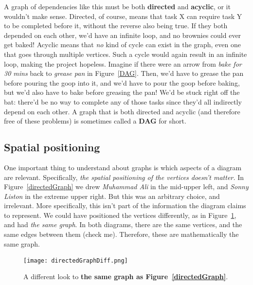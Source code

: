 \begin{description}
A graph of dependencies like this must be both \textbf{directed} and
\textbf{acyclic}, or it wouldn't make sense. Directed, of course, means
that task X can require task Y to be completed before it, without the
reverse also being true. If they both depended on each other, we'd have an
infinite loop, and no brownies could ever get baked! Acyclic means that
\textit{no} kind of cycle can exist in the graph, even one that goes
through multiple vertices. Such a cycle would again result in an infinite
loop, making the project hopeless. Imagine if there were an arrow from
\textsl{bake for 30 mins} back to \textsl{grease pan} in Figure~\ref{DAG}.
Then, we'd have to grease the pan before pouring the goop into it, and we'd
have to pour the goop before baking, but we'd also have to bake before
greasing the pan! We'd be stuck right off the bat: there'd be no way to
complete any of those tasks since they'd all indirectly depend on each
other. A graph that is both directed and acyclic (and therefore free of
these problems) is sometimes called a \textbf{DAG} for short.

\end{description}


\subsection{Spatial positioning}

One important thing to understand about graphs is which aspects of a
diagram are relevant. Specifically, \textit{the spatial positioning of the
vertices doesn't matter.} In Figure~\ref{directedGraph} we drew
\textsl{Muhammad Ali} in the mid-upper left, and \textsl{Sonny Liston}  in
the extreme upper right. But this was an arbitrary choice, and irrelevant.
More specifically, this isn't part of the information the diagram claims to
represent. We could have positioned the vertices differently, as in
Figure~\ref{directedGraphDiff}, and had \textit{the same graph}. In both
diagrams, there are the same vertices, and the same edges between them
(check me). Therefore, these are mathematically the same graph.

\begin{figure}[ht]
\centering
\texttt{[image: directedGraphDiff.png]}
\caption{A different look to \textbf{the same graph as
Figure~\ref{directedGraph}}.}
\label{directedGraphDiff}
\end{figure}

